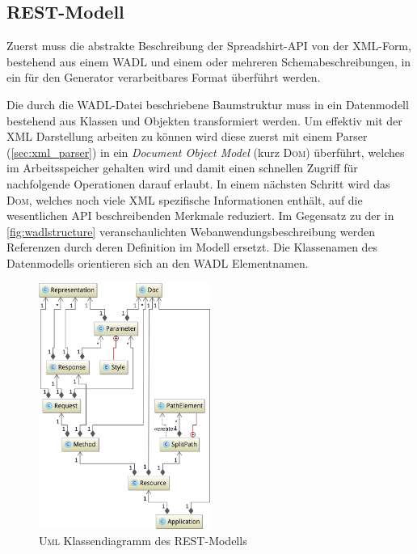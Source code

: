 \subsection{REST-Modell}
\label{sec:rest_model}

Zuerst muss die abstrakte Beschreibung der Spreadshirt-\gls{API} von der \gls{XML}-Form, bestehend aus einem \gls{WADL} und einem oder mehreren Schemabeschreibungen, in ein für den Generator verarbeitbares Format überführt werden.

Die durch die \gls{WADL}-Datei beschriebene Baumstruktur muss in ein Datenmodell bestehend aus Klassen und Objekten transformiert werden.
Um effektiv mit der \gls{XML} Darstellung arbeiten zu können wird diese zuerst mit einem Parser (\cref{sec:xml_parser}) in ein \emph{Document Object Model} (kurz \textsc{Dom}) überführt, welches im Arbeitsspeicher gehalten wird und damit einen schnellen Zugriff für nachfolgende Operationen darauf erlaubt. In einem nächsten Schritt wird das \textsc{Dom}, welches noch viele \gls{XML} spezifische Informationen enthält, auf die wesentlichen \gls{API} beschreibenden Merkmale reduziert. Im Gegensatz zu der in \cref{fig:wadlstructure} veranschaulichten Webanwendungsbeschreibung werden Referenzen durch deren Definition im Modell ersetzt. Die Klassenamen des Datenmodells orientieren sich an den \gls{WADL} Elementnamen.

\begin{figure}[tb]
    \centering
    \includegraphics[width=0.5\textwidth]{resources/restmodel}
    \caption{\textsc{Uml} Klassendiagramm des \gls{REST}-Modells}
    \label{fig:restmodel}
\end{figure}

